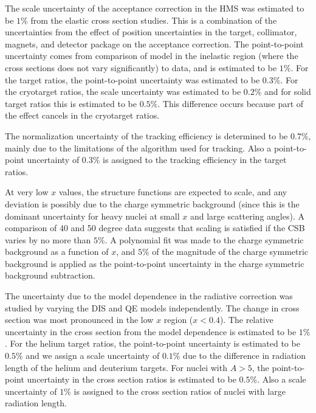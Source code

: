 {The scale uncertainty of the acceptance correction in the HMS was estimated to
be $1\%$ from the elastic cross section studies. This is a combination of the
uncertainties from the effect of position uncertainties in the target,
collimator, magnets, and detector package on the acceptance correction. The 
point-to-point uncertainty comes from comparison of model in the inelastic
region (where the cross sections does not vary significantly) to data, and is
estimated to be $1\%$. For the target ratios, the point-to-point uncertainty
was estimated to be $0.3\%$. For the cryotarget ratios, the scale uncertainty
was estimated to be $0.2\%$ and for solid target ratios this is estimated to
be $0.5\%$. This difference occurs because part of the effect cancels in
the cryotarget ratios.

The normalization uncertainty of the tracking efficiency is determined to be
$0.7\%$, mainly due to the limitations of the algorithm used for tracking.
Also a point-to-point uncertainty of $0.3\%$ is assigned to the tracking
efficiency in the target ratios.

%
%

At very low $x$ values, the structure functions are expected to scale, and any
deviation is possibly due to the charge symmetric background (since this is
the dominant uncertainty for heavy nuclei at small $x$ and large scattering
angles). A comparison of 40 and 50 degree data suggests that scaling is
satisfied if the CSB varies by no more than $5\%$. A polynomial fit was made
to the charge symmetric background as a function of $x$, and $5\%$ of the
magnitude of the charge symmetric background is applied as the point-to-point
uncertainty in the charge symmetric background subtraction.

The uncertainty due to the model dependence in the radiative correction was
studied by varying the DIS and QE models independently. The change in cross
section was most pronounced in the low $x$ region ($x<0.4$). The relative
uncertainty in the cross section from the model dependence is estimated to be
$1\%$. For the helium target ratios, the point-to-point uncertainty is
estimated to be $0.5\%$ and we assign a scale uncertainty of $0.1\%$ due to
the difference in radiation length of the helium and deuterium targets. For
nuclei with $A>5$, the point-to-point uncertainty in the cross section ratios
is estimated to be $0.5\%$. Also a scale uncertainty of $1\%$ is assigned to
the cross section ratios of nuclei with large radiation length.

}
